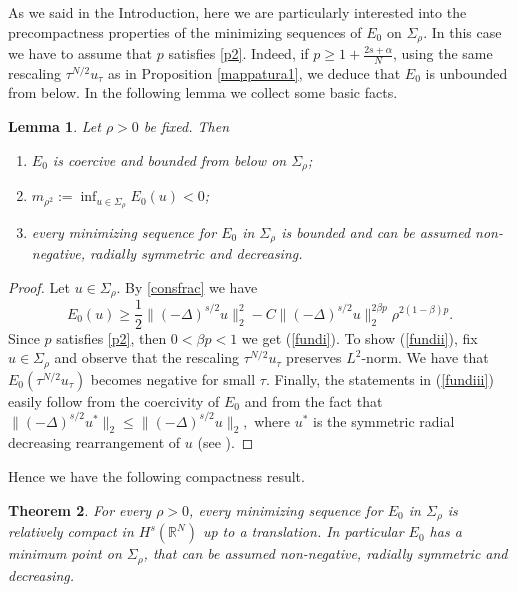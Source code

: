 \documentclass[10pt]{amsart}
\numberwithin{equation}{section}
\newtheorem{theorem}{Theorem}[section]
\newtheorem{lemma}[theorem]{Lemma}
\begin{document}
\vspace{10pt}

\noindent
As we said in the Introduction, here we are particularly interested into the precompactness properties of the minimizing sequences of $E_0$ on $\Sigma_{\rho}$. In this case we have to assume that $p$ satisfies \eqref{p2}. Indeed, if $p\geq 1+\frac{2s+\alpha}{N}$, using the same rescaling $\tau^{N/2}u_\tau$ as in Proposition \ref{mappatura1}, we deduce that $E_0$ is unbounded from below.
In the following lemma we collect some basic facts.
\begin{lemma}\label{lemma:fundamental}
Let $\rho>0$ be fixed. Then
\begin{enumerate}[label=(\roman*),ref=\roman*]
\item \label{fundi}$E_0$ is coercive and bounded from below on  $\Sigma_{\rho}$;
\item \label{fundii}$m_{\rho^2}:=\inf_{u\in \Sigma_{\rho}}E_0(u)<0$; 
\item \label{fundiii}every minimizing sequence for $E_0$ in $\Sigma_{\rho}$ is bounded and can be assumed non-negative, radially symmetric
and decreasing.
\end{enumerate}
\end{lemma}
\begin{proof}
Let $u\in \Sigma_{\rho}$. By \eqref{consfrac} we have
\begin{equation*} 
E_0(u)
\geq 
\frac{1}{2} \|(-\Delta)^{s/2}u\|_2^{2} - C \|(-\Delta)^{s/2}u\|_{2}^{2 \beta p} \rho^{2(1-\beta)p}.
\end{equation*}
Since $p$ satisfies \eqref{p2}, then $0<\beta p < 1$ we get (\ref{fundi}).
To show (\ref{fundii}),  fix $u\in \Sigma_{\rho}$ and observe that the rescaling $\tau^{N/2}u_\tau$ preserves $L^2$-norm. We have that $E_0(\tau^{N/2}u_\tau)$
becomes negative for small $\tau$.
Finally, the  statements in (\ref{fundiii}) easily follow  from the coercivity of $E_0$ and from 
the fact that 
$\|(-\Delta)^{s/2}u^{*}\|_{2}\leq \|(-\Delta)^{s/2}u\|_{2},$
where $u^{*}$ is the symmetric radial decreasing rearrangement of $u$
(see   \cite[Theorem 3]{B}).
\end{proof}
\noindent

\noindent
Hence we have the following compactness result.
\begin{theorem}
\label{EXMinimo}
For every $\rho>0$, every minimizing sequence for $E_0$ in $\Sigma_\rho$ is relatively compact  in $H^s({\mathbb R}^N)$ up to a translation. In particular $E_0$ has a minimum point on $\Sigma_{\rho}$, that can be assumed non-negative, radially symmetric and decreasing.
\end{theorem}
\end{document}
